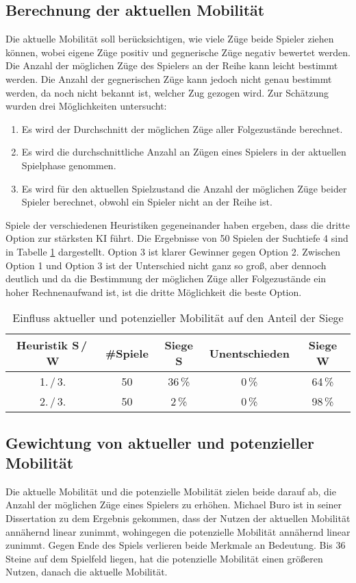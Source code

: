 \subsection{Berechnung der aktuellen Mobilität}
\label{sec:currentmobility}
Die aktuelle Mobilität soll berücksichtigen, wie viele Züge beide Spieler ziehen können, wobei eigene Züge positiv und
gegnerische Züge negativ bewertet werden. Die Anzahl der möglichen Züge des Spielers an der Reihe kann leicht bestimmt
werden. Die Anzahl der gegnerischen Züge kann jedoch nicht genau bestimmt werden, da noch nicht bekannt ist, welcher Zug
gezogen wird. Zur Schätzung wurden drei Möglichkeiten untersucht:
\begin{enumerate}
    \item Es wird der Durchschnitt der möglichen Züge aller Folgezustände berechnet.
    \item Es wird die durchschnittliche Anzahl an Zügen eines Spielers in der aktuellen Spielphase genommen.
    \item Es wird für den aktuellen Spielzustand die Anzahl der möglichen Züge beider Spieler berechnet, obwohl ein
    Spieler nicht an der Reihe ist.
\end{enumerate}
Spiele der verschiedenen Heuristiken gegeneinander haben ergeben, dass die dritte Option zur stärksten KI führt. Die
Ergebnisse von 50 Spielen der Suchtiefe 4 sind in Tabelle \ref{table:currentmobility} dargestellt. Option 3 ist klarer
Gewinner gegen Option 2. Zwischen Option 1 und Option 3 ist der Unterschied nicht ganz so groß, aber dennoch deutlich
und da die Bestimmung der möglichen Züge aller Folgezustände ein hoher Rechnenaufwand ist, ist die dritte Möglichkeit
die beste Option.

\begin{table}[hb]
\centering
\begin{tabular}{c|c|ccc}
\hline
Heuristik S\,/\,W & \#Spiele & Siege S & Unentschieden & Siege W \\
\hline
 1.\,/\,3. & 50 & 36\,\% &  0\,\% & 64\,\% \\
 2.\,/\,3. & 50 &  2\,\% &  0\,\% & 98\,\% \\
\hline
\end{tabular}
\caption{Einfluss aktueller und potenzieller Mobilität auf den Anteil der Siege}
\label{table:currentmobility}
\end{table}

\subsection{Gewichtung von aktueller und potenzieller Mobilität}
\label{sec:combinedmobility}
Die aktuelle Mobilität und die potenzielle Mobilität zielen beide darauf ab, die Anzahl der möglichen Züge eines
Spielers zu erhöhen. Michael Buro ist in seiner Dissertation zu dem Ergebnis gekommen, dass der Nutzen der aktuellen
Mobilität annähernd linear zunimmt, wohingegen die potenzielle Mobilität annähernd linear zunimmt. Gegen Ende des Spiels
verlieren beide Merkmale an Bedeutung. Bis 36 Steine auf dem Spielfeld liegen, hat die potenzielle Mobilität einen
größeren Nutzen, danach die aktuelle Mobilität. \cite[S.~20]{evaluationfunctions}

